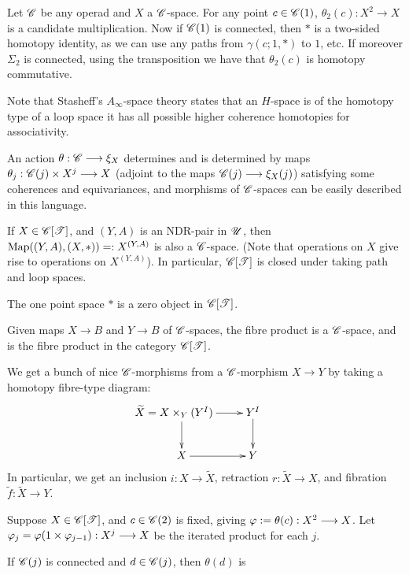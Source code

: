\documentclass[11pt]{article}
\begin{document}
\begin{chapter1-3}
Let $\mathscr{C}$ be any operad and $X$ a $\mathscr{C}$-space. For any point
$c\in\mathscr{C}(1)$, $\theta_2(c):X^2\to X$ is a candidate multiplication.
Now if $\mathscr{C}(1)$ is connected, then $*$ is a two-sided homotopy identity, as
we can use any paths from $\gamma(c;1,*)$ to $1$, etc.
If moreover $\Sigma_2$ is connected, using the transposition we have that
$\theta_2(c)$ is homotopy commutative.

Note that Stasheff's $A_\infty$-space theory states that an $H$-space is of
the homotopy type of a loop space \Iff it has all possible higher coherence
homotopies for associativity.
\begin{lem*}[1.4]
An action $\theta:\mathscr{C}\longrightarrow\xi_X$ determines and is determined by maps 
$\theta_j:\mathscr{C}(j)\times X^j\longrightarrow X$ (adjoint to the maps $\mathscr{C}(j)\longrightarrow\xi_X(j)$)
satisfying some coherences and equivariances, and morphisms of $\mathscr{C}$-spaces 
can be easily described in this language.
\end{lem*}
\begin{lem*}[1.5]
If $X\in\mathscr{C}[\mathscr{T}]$, and $(Y,A)$ is an NDR-pair in $\mathscr{U}$, then 
$\operatorname{Map}((Y,A),(X,*))=:X^{(Y,A)}$ is also a $\mathscr{C}$-space. (Note that operations
on $X$ give rise to operations on $X^{(Y,A)}$). In particular, $\mathscr{C}[\mathscr{T}]$ is
closed under taking path and loop spaces.
\end{lem*}
\begin{lem*}[1.6]
The one point space $*$ is a zero object in $\mathscr{C}[\mathscr{T}]$.
\end{lem*}
\begin{lem*}[1.7]
Given maps $X\to B$ and $Y\to B$ of $\mathscr{C}$-spaces, the fibre product is a 
$\mathscr{C}$-space, and is the fibre product in the category $\mathscr{C}[\mathscr{T}]$.
\end{lem*}
\begin{lem*}[1.8] We get a bunch of nice $\mathscr{C}$-morphisms from a $\mathscr{C}$-morphism
$X\to Y$ by taking a homotopy fibre-type diagram:
\[\xymatrix{
\makebox[2cm][r]{$\widetilde X=X\times_Y(Y^I)$}\ar[r]\ar[d]&Y^I\ar[d]\\
X\ar[r]&Y
}\]
In particular, we get an inclusion $i:X\to \widetilde X$,
retraction $r:\widetilde X\to X$, and fibration 
$\widetilde f:\widetilde X\to Y$.
\end{lem*}
\begin{lem*}[1.9]
Suppose $X\in\mathscr{C}[\mathscr{T}]$, and $c\in\mathscr{C}(2)$ is fixed, giving 
$\oldphi:=\theta(c):X^2\to X$. Let 
$\oldphi_j=\oldphi(1\times \oldphi_{j-1}):X^j\to X$ be the iterated product 
for each $j$.
\begin{itemise}
\item If $\mathscr{C}(j)$ is connected and $d\in\mathscr{C}(j)$, then $\theta(d)$ is 

\end{itemise}
\end{lem*}
\end{chapter1-3}
\end{document}
